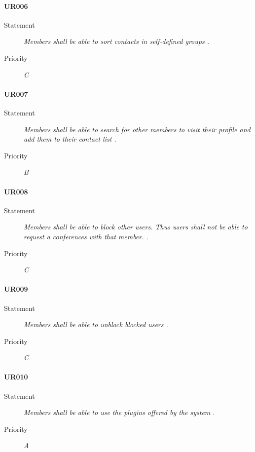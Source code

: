 \paragraph{UR006}
  \begin{description}
  \item [Statement] 
    \textit{ Members shall be able to sort contacts in self-defined groups
    .}
  \item [Priority] \textit{C}
\end{description}

\paragraph{UR007}
  \begin{description}
  \item [Statement] 
    \textit{ Members shall be able to search for other members to visit their profile and add them to their contact list
    .}
  \item [Priority] \textit{B}
\end{description}

\paragraph{UR008}
  \begin{description}
  \item [Statement] 
    \textit{ Members shall be able to block other users.
            Thus users shall not be able to request a conferences with that member.
    .}
  \item [Priority] \textit{C}
\end{description}

\paragraph{UR009}
  \begin{description}
  \item [Statement] 
    \textit{ Members shall be able to unblock blocked users
    .}
  \item [Priority] \textit{C}
\end{description}

\paragraph{UR010}
  \begin{description}
  \item [Statement] 
    \textit{ Members shall be able to use the plugins offered by the system
    .}
  \item [Priority] \textit{A}
\end{description}

